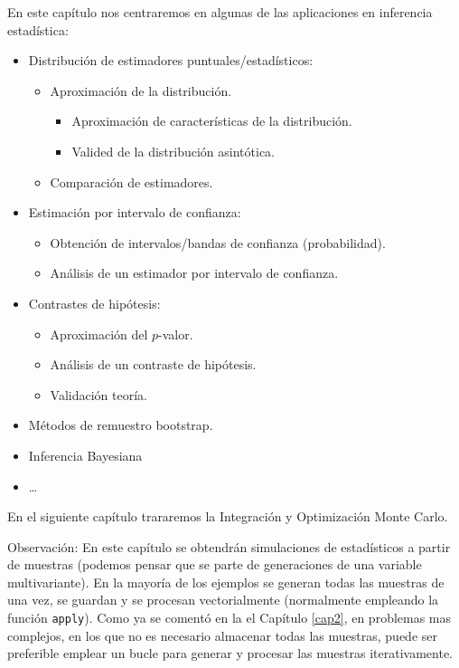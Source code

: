 \documentclass[
]{book}
\theoremstyle{break}
\theoremstyle{definition}
\theoremstyle{definition}
\theoremstyle{definition}
\theoremstyle{remark}
\begin{document}
En este capítulo nos centraremos en
algunas de las aplicaciones en inferencia estadística:

\begin{itemize}
\item
  Distribución de estimadores puntuales/estadísticos:

  \begin{itemize}
  \item
    Aproximación de la distribución.

    \begin{itemize}
    \item
      Aproximación de características de la distribución.
    \item
      Valided de la distribución asintótica.
    \end{itemize}
  \item
    Comparación de estimadores.
  \end{itemize}
\item
  Estimación por intervalo de confianza:

  \begin{itemize}
  \item
    Obtención de intervalos/bandas de confianza (probabilidad).
  \item
    Análisis de un estimador por intervalo de confianza.
  \end{itemize}
\item
  Contrastes de hipótesis:

  \begin{itemize}
  \item
    Aproximación del \(p\)-valor.
  \item
    Análisis de un contraste de hipótesis.
  \item
    Validación teoría.
  \end{itemize}
\item
  Métodos de remuestro bootstrap.
\item
  Inferencia Bayesiana
\item
  \ldots{}
\end{itemize}

En el siguiente capítulo trararemos la Integración y Optimización Monte Carlo.

Observación:
En este capítulo se obtendrán simulaciones de estadísticos a partir de muestras (podemos pensar que se parte de generaciones de una variable multivariante).
En la mayoría de los ejemplos se generan todas las muestras de una vez, se guardan y se procesan vectorialmente (normalmente empleando la función \texttt{apply}).
Como ya se comentó en la el Capítulo \ref{cap2}, en problemas mas complejos, en los que no es necesario almacenar todas las muestras, puede ser preferible emplear un bucle para generar y procesar las muestras iterativamente.
\end{document}
